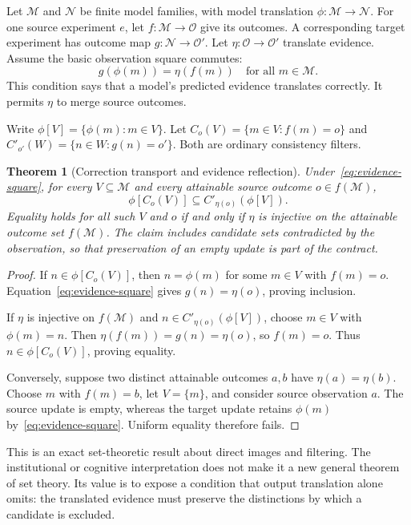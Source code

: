 \documentclass[11pt,letterpaper]{article}
\theoremstyle{plain}
\newtheorem{theorem}{Theorem}[section]
\theoremstyle{definition}
\newcommand{\M}{\mathcal M}\newcommand{\E}{\mathbb E}
\begin{document}
Let $\M$ and $\mathcal N$ be finite model families, with model translation $\phi:\M\to\mathcal N$. For one source experiment $e$, let $f:\M\to\mathcal O$ give its outcomes. A corresponding target experiment has outcome map $g:\mathcal N\to\mathcal O'$. Let $\eta:\mathcal O\to\mathcal O'$ translate evidence. Assume the basic observation square commutes:
\begin{equation}\label{eq:evidence-square}
g(\phi(m))=\eta(f(m))\quad\text{for all }m\in\M.
\end{equation}
This condition says that a model's predicted evidence translates correctly. It permits $\eta$ to merge source outcomes.

Write $\phi[V]=\{\phi(m):m\in V\}$. Let $C_o(V)=\{m\in V:f(m)=o\}$ and $C'_{o'}(W)=\{n\in W:g(n)=o'\}$. Both are ordinary consistency filters.

\begin{theorem}[Correction transport and evidence reflection]\label{thm:correction}
Under~\eqref{eq:evidence-square}, for every $V\subseteq\M$ and every attainable source outcome $o\in f(\M)$,
\begin{equation}\label{eq:correction-inclusion}
\phi[C_o(V)]\subseteq C'_{\eta(o)}(\phi[V]).
\end{equation}
Equality holds for all such $V$ and $o$ if and only if $\eta$ is injective on the attainable outcome set $f(\M)$. The claim includes candidate sets contradicted by the observation, so that preservation of an empty update is part of the contract.
\end{theorem}
\begin{proof}
If $n\in\phi[C_o(V)]$, then $n=\phi(m)$ for some $m\in V$ with $f(m)=o$. Equation~\eqref{eq:evidence-square} gives $g(n)=\eta(o)$, proving inclusion.

If $\eta$ is injective on $f(\M)$ and $n\in C'_{\eta(o)}(\phi[V])$, choose $m\in V$ with $\phi(m)=n$. Then $\eta(f(m))=g(n)=\eta(o)$, so $f(m)=o$. Thus $n\in\phi[C_o(V)]$, proving equality.

Conversely, suppose two distinct attainable outcomes $a,b$ have $\eta(a)=\eta(b)$. Choose $m$ with $f(m)=b$, let $V=\{m\}$, and consider source observation $a$. The source update is empty, whereas the target update retains $\phi(m)$ by~\eqref{eq:evidence-square}. Uniform equality therefore fails.
\end{proof}
This is an exact set-theoretic result about direct images and filtering. The institutional or cognitive interpretation does not make it a new general theorem of set theory. Its value is to expose a condition that output translation alone omits: the translated evidence must preserve the distinctions by which a candidate is excluded.
\end{document}

